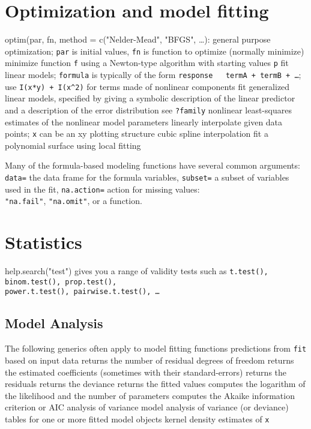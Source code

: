 \section{Optimization and model fitting}{{\smalltt optim(par, fn, method =
c("Nelder-Mead", "BFGS", \ldots)}: general purpose optimization; {\tt par} is
initial values, {\tt fn} is function to optimize (normally minimize)}
	{minimize function {\tt f} using a Newton-type algorithm with
starting values {\tt p}}
	{fit linear models; {\tt formula} is typically of the form
{\tt response ~ termA + termB + \ldots}; use {\tt I(x*y) + I(x\^{}2)} for terms
made of nonlinear components}
	{fit generalized linear models, specified by giving
a symbolic description of the linear predictor and a description of the error
distribution}
	{see {\tt ?family}}
	{nonlinear least-squares estimates of the nonlinear model
parameters}
	{linearly interpolate given data points; {\tt x} can be an
xy plotting structure}
	{cubic spline interpolation}
	{fit a polynomial surface using local fitting}

Many of the formula-based modeling functions have several common
arguments: {\tt data=} the data frame for the formula variables,
{\tt subset=} a subset of variables used in the fit,
{\tt na.action=} action for missing values:\\{\tt "na.fail"}, {\tt "na.omit"}, or
a function.

\section{Statistics}{help.search("test") gives you a range of validity tests
such as {\tt t.test(), binom.test(), prop.test(),\\power.t.test(),
pairwise.t.test(), \ldots}}
\subsection{Model Analysis}	{The following generics often apply to model fitting functions}
	{predictions from {\tt fit} based on input data}
	{ returns the number of residual degrees of freedom}
	{ returns the estimated coefficients (sometimes with their standard-errors)}
	{ returns the residuals}
	{ returns the deviance}
	{ returns the fitted values}
	{ computes the logarithm of the likelihood and the number of parameters}
	{ computes the Akaike information criterion or AIC}
	{analysis of variance model}
	{analysis of variance (or deviance) tables for one or more fitted model objects}
	{kernel density estimates of {\tt x}}

